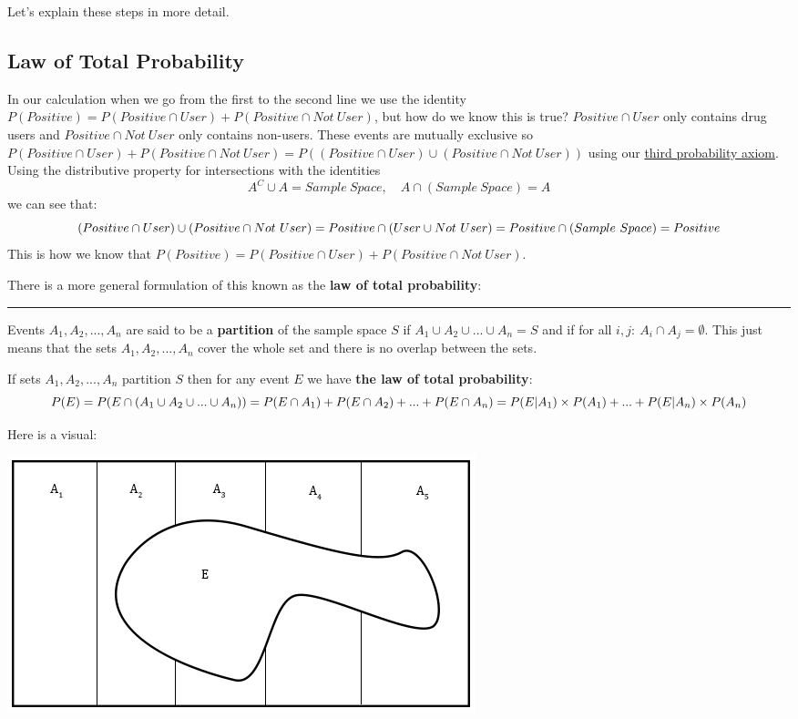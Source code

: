 \documentclass[
]{book}
\theoremstyle{definition}
\theoremstyle{definition}
\theoremstyle{definition}
\theoremstyle{remark}
\begin{document}
Let's explain these steps in more detail.

\hypertarget{law-of-total-probability}{%
\subsection{Law of Total Probability}\label{law-of-total-probability}}

In our calculation when we go from the first to the second line we use the identity \(P(Positive)=P(Positive \cap User)+P(Positive \cap Not \ User)\), but how do we know this is true?
\(Positive \cap User\) only contains drug users and \(Positive \cap Not \ User\) only contains non-users. These events are mutually exclusive so \(P(Positive \cap User)+P(Positive \cap Not \ User) = P((Positive \cap User) \cup (Positive \cap Not \ User))\) using our \protect\hyperlink{axiomsprob}{third probability axiom}. Using the distributive property for intersections with the identities
\[A^C \cup A = Sample \ Space, \quad A \cap (Sample \ Space) = A\]
we can see that:
\[(Positive \cap User) \cup (Positive \cap Not \ User) = Positive \cap (User \cup Not \ User) = \\ Positive \cap (Sample \ Space) = Positive\]
This is how we know that \(P(Positive)=P(Positive \cap User)+P(Positive \cap Not \ User)\).

There is a more general formulation of this known as the \textbf{law of total probability}:

\begin{center}\rule{0.5\linewidth}{0.5pt}\end{center}

Events \(A_1,A_2,...,A_n\) are said to be a \textbf{partition} of the sample space \(S\) if \(A_1 \cup A_2 \cup... \cup A_n=S\) and if for all \(i,j: \ A_i \cap A_j = \emptyset\). This just means that the sets \(A_1,A_2,...,A_n\) cover the whole set and there is no overlap between the sets.

If sets \(A_1,A_2,...,A_n\) partition \(S\) then for any event \(E\) we have \textbf{the law of total probability}:
\[P(E) = P(E \cap (A_1 \cup A_2 \cup ... \cup A_n)) = \\ P(E \cap A_1) + P(E \cap A_2) + ... + P(E \cap A_n) = \\ P(E|A_1) \times P(A_1) +...+ P(E|A_n) \times P(A_n)\]

Here is a visual:

\includegraphics{Pictures/03-Probability/totalprob.PNG}
\end{document}
